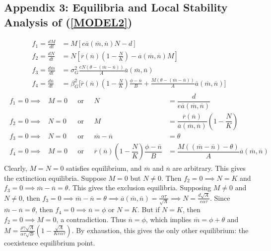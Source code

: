 \documentclass{amsart}
\theoremstyle{definition}
\theoremstyle{remark}
\numberwithin{equation}{section}
\begin{document}
\subsection*{Appendix 3: Equilibria and Local Stability Analysis of (\ref{MODEL2})}
\begin{align*}
	f_1 = \frac{dM}{dt} &= M\left[e\overline{a}(\overline{m}, \overline{n})N - d\right] \\[5px]
	f_2 = \frac{dN}{dt} &= N\left[\overline{r}(\overline{n})\left(1 - \frac{N}{K}\right) - \overline{a}(\overline{m}, \overline{n})M\right] \\[5px]
	f_3 = \frac{d\overline{m}}{dt} &= \sigma_{G}^2\frac{eN(\theta - (\overline{m} - \overline{n}))}{A}\overline{a}(\overline{m}, \overline{n}) \\[5px]
	f_4 = \frac{d\overline{n}}{dt} &= \beta_{G}^2\Bigg[\overline{r}(\overline{n})\left(1 - \frac{N}{K}\right)\frac{\phi - \overline{n}}{B} + \frac{M(\theta - (\overline{m} - \overline{n}))}{A}\overline{a}(\overline{m}, \overline{n})\Bigg]
\end{align*}
\begin{align*}
	\begin{array}{cccrl}
		f_1 = 0 \implies& M = 0 \ \ \ &\text{or}&\ \ \ N &= \dfrac{d}{e\overline{a}(\overline{m}, \overline{n})} \\[10px]
		f_2 = 0 \implies& N = 0 \ \ \ &\text{or}&\ \ \ M &= \dfrac{\overline{r}(\overline{n})}{\overline{a}(\overline{m}, \overline{n})}\left(1 - \dfrac{N}{K}\right) \\[10px]
		f_3 = 0 \implies& N = 0 \ \ \ &\text{or}&\ \ \ \overline{m} - \overline{n} &= \theta \\[10px]
		f_4 = 0 \implies& M = 0 \ \ \ &\text{or}&\ \ \ \overline{r}(\overline{n})\left(1 - \dfrac{N}{K}\right)\dfrac{\phi - \overline{n}}{B} &= \dfrac{M((\overline{m} - \overline{n}) - \theta)}{A}\overline{a}(\overline{m}, \overline{n})
	\end{array}
\end{align*}
Clearly, $M = N = 0$ satisfies equilibrium, and $\overline{m}$ and $\overline{n}$ are arbitrary.  This gives the extinction equilibria.  Suppose $M = 0$ but $N \neq 0$.  Then $f_2 = 0 \implies N = K$ and $f_3 = 0 \implies \overline{m} - \overline{n} = \theta$.  This gives the exclusion equilibria.  Supposing $M \neq 0$ and $N \neq 0$, then $f_3 = 0 \implies \overline{m} - \overline{n} = \theta \implies \overline{a}(\overline{m}, \overline{n}) = \frac{\alpha\tau}{\sqrt{A}} \implies N = \frac{d\sqrt{A}}{e\alpha\tau}$.  Since $\overline{m} - \overline{n} = \theta$, then $f_4 = 0 \implies \overline{n} = \phi$ or $N = K$.  But if $N = K$, then $f_2 = 0 \implies M = 0$, a contradiction.  Thus $\overline{n} = \phi$, which implies $\overline{m} = \phi + \theta$ and $M = \frac{\rho\gamma\sqrt{A}}{\alpha\tau\sqrt{B}}\left(1 - \frac{\sqrt{A}}{Ke\alpha\tau}\right)$.  By exhaustion, this gives the only other equilibrium: the coexistence equilibrium point.
\end{document}
